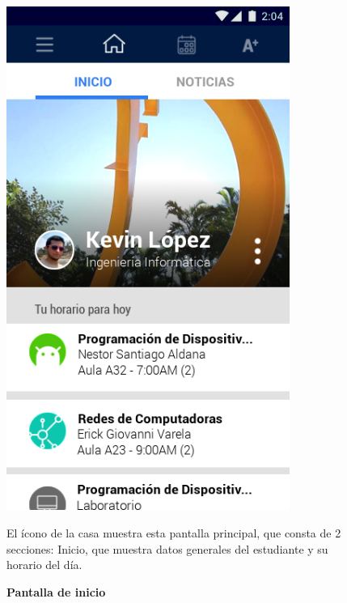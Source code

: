 \documentclass[12pt]{article}
\begin{document}
\begin{figure}[t]
	\begin{minipage}[t]{0.45\textwidth}
		\centering
		\caption{\textbf{Pantalla de inicio}}
		\label{fig:horarioDiario}
		\includegraphics[width=0.825\textwidth]{img/2.png}\\
	\end{minipage}\hfill
	\begin{minipage}[t]{0.45\textwidth}
		\vspace*{10mm}
		El ícono de la casa muestra esta pantalla principal, que consta de 2 secciones: Inicio, que muestra datos generales del estudiante y su horario del día.
	\end{minipage}
\end{figure}
\end{document}
